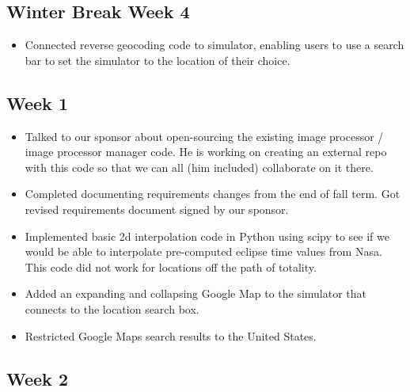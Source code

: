 \documentclass[10pt, onecolumn, draftclsnofoot, letterpaper, compsoc]{IEEEtran}
\begin{document}
\subsection{Winter Break Week 4}

    \begin{itemize}

    \item Connected reverse geocoding code to simulator, enabling users to use a search
	      bar to set the simulator to the location of their choice.

    \end{itemize}

\subsection{Week 1}

    \begin{itemize}

	\item Talked to our sponsor about open-sourcing the existing image processor /
		  image processor manager code. He is working on creating an external repo with
		  this code so that we can all (him included) collaborate on it there.

	\item Completed documenting requirements changes from the end of fall term. Got
		  revised requirements document signed by our sponsor.

	\item Implemented basic 2d interpolation code in Python using scipy to see if we
		  would be able to interpolate pre-computed eclipse time values from Nasa.
		  This code did not work for locations off the path of totality.

    \item Added an expanding and collapsing Google Map to the simulator that connects
          to the location search box.

    \item Restricted Google Maps search results to the United States.

    \end{itemize}

\subsection{Week 2}
\end{document}
